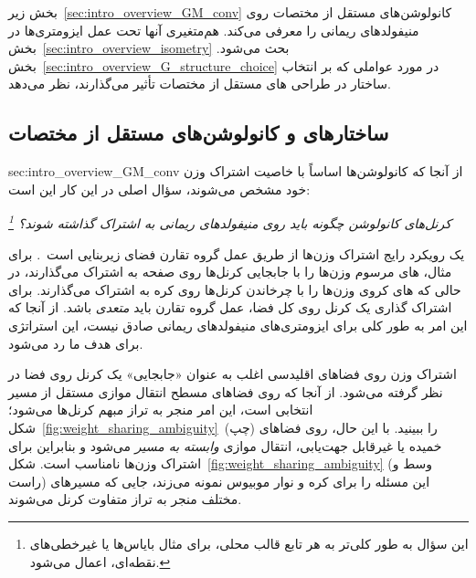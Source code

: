 بخش زیر~\ref{sec:intro_overview_GM_conv} کانولوشن‌های مستقل از مختصات \lr{$\GM$} روی منیفولدهای ریمانی را معرفی می‌کند.
هم‌متغیری آنها تحت عمل ایزومتری‌ها در بخش~\ref{sec:intro_overview_isometry} بحث می‌شود.
بخش~\ref{sec:intro_overview_G_structure_choice} در مورد عواملی که بر انتخاب ساختار  در طراحی های مستقل از مختصات تأثیر می‌گذارند، نظر می‌دهد.




\toclesslab\subsection{ساختارهای  و کانولوشن‌های مستقل از مختصات }{sec:intro_overview_GM_conv}
از آنجا که کانولوشن‌ها اساساً با خاصیت اشتراک وزن خود مشخص می‌شوند، سؤال اصلی در این کار این است:
\vspace*{-1ex}
\begin{center}\it
	کرنل‌های کانولوشن چگونه باید روی منیفولدهای ریمانی به اشتراک گذاشته شوند؟
	\footnote{
		این سؤال به طور کلی‌تر به هر تابع قالب محلی، برای مثال بایاس‌ها یا غیرخطی‌های نقطه‌ای، اعمال می‌شود.
	}
\end{center}

\marginnote{} %


یک رویکرد رایج  اشتراک وزن‌ها از طریق عمل گروه تقارن فضای زیربنایی است~\cite{Cohen2016-GCNN,Kondor2018-GENERAL}.
برای مثال، های مرسوم وزن‌ها را با جابجایی کرنل‌ها روی صفحه به اشتراک می‌گذارند، در حالی که های کروی وزن‌ها را با چرخاندن کرنل‌ها روی کره به اشتراک می‌گذارند.
برای اشتراک گذاری یک کرنل روی کل فضا، عمل گروه تقارن باید \emph{متعدی} باشد.
از آنجا که این امر به طور کلی برای ایزومتری‌های منیفولدهای ریمانی صادق نیست، این استراتژی برای هدف ما رد می‌شود.


اشتراک وزن روی فضاهای اقلیدسی اغلب به عنوان «جابجایی» یک کرنل روی فضا در نظر گرفته می‌شود.
از آنجا که روی فضاهای مسطح انتقال موازی مستقل از مسیر انتخابی است، این امر منجر به تراز مبهم کرنل‌ها می‌شود؛ شکل~\ref{fig:weight_sharing_ambiguity}~(چپ) را ببینید.
با این حال، روی فضاهای خمیده یا غیرقابل جهت‌یابی، انتقال موازی \emph{وابسته به مسیر} می‌شود و بنابراین برای اشتراک وزن‌ها نامناسب است.
شکل~\ref{fig:weight_sharing_ambiguity} (وسط و راست) این مسئله را برای کره و نوار موبیوس نمونه می‌زند، جایی که مسیرهای مختلف منجر به تراز متفاوت کرنل می‌شوند.


